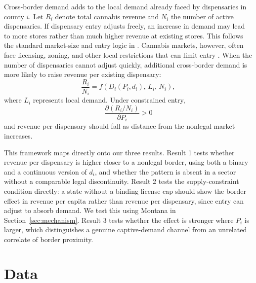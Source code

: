 \documentclass[12pt]{article}
\begin{document}
Cross-border demand adds to the local demand already faced by dispensaries in county $i$. Let $R_i$ denote
total cannabis revenue and $N_i$ the number of active dispensaries. If dispensary entry adjusts freely, an
increase in demand may lead to more stores rather than much higher revenue at existing stores. This follows
the standard market-size and entry logic in \citet{BresnahanReiss1991}. Cannabis markets, however, often
face licensing, zoning, and other local restrictions that can limit entry \citep{HollenbeckUetake2021}. When
the number of dispensaries cannot adjust quickly, additional cross-border demand is more likely to raise
revenue per existing dispensary:
\begin{equation}
\frac{R_i}{N_i}
=
f\left(D_i(P_i,d_i),\,L_i,\,N_i\right),
\end{equation}
where $L_i$ represents local demand. Under constrained entry,
\begin{equation}
\frac{\partial (R_i/N_i)}{\partial P_i} > 0
\end{equation}
and revenue per dispensary should fall as distance from the nonlegal market increases.

This framework maps directly onto our three results. Result 1 tests whether revenue per dispensary is higher
closer to a nonlegal border, using both a binary and a continuous version of $d_i$, and whether the pattern
is absent in a sector without a comparable legal discontinuity. Result 2 tests the supply-constraint
condition directly: a state without a binding license cap should show the border effect in revenue per
capita rather than revenue per dispensary, since entry can adjust to absorb demand. We test this using
Montana in Section~\ref{sec:mechanism}. Result 3 tests whether the effect is stronger where $P_i$ is larger,
which distinguishes a genuine captive-demand channel from an unrelated correlate of border proximity.

\section{Data}
\label{sec:data}
\end{document}
